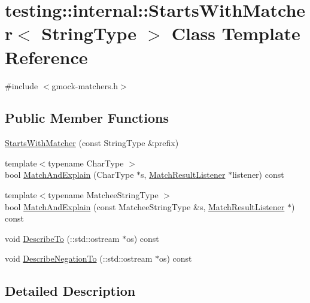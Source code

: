 \hypertarget{classtesting_1_1internal_1_1_starts_with_matcher}{}\section{testing\+:\+:internal\+:\+:Starts\+With\+Matcher$<$ String\+Type $>$ Class Template Reference}
\label{classtesting_1_1internal_1_1_starts_with_matcher}


{\ttfamily \#include $<$gmock-\/matchers.\+h$>$}

\subsection*{Public Member Functions}
\begin{DoxyCompactItemize}
\item 
\hyperlink{classtesting_1_1internal_1_1_starts_with_matcher_ab06a2a2a4c506771f20754bdbf8742bc}{Starts\+With\+Matcher} (const String\+Type \&prefix)
\item 
{\footnotesize template$<$typename Char\+Type $>$ }\\bool \hyperlink{classtesting_1_1internal_1_1_starts_with_matcher_ad9aa7f9761c63607a6a39c474575c2c9}{Match\+And\+Explain} (Char\+Type $\ast$s, \hyperlink{classtesting_1_1_match_result_listener}{Match\+Result\+Listener} $\ast$listener) const 
\item 
{\footnotesize template$<$typename Matchee\+String\+Type $>$ }\\bool \hyperlink{classtesting_1_1internal_1_1_starts_with_matcher_a5912b3df33ea79e6b602bcea0b60443d}{Match\+And\+Explain} (const Matchee\+String\+Type \&s, \hyperlink{classtesting_1_1_match_result_listener}{Match\+Result\+Listener} $\ast$) const 
\item 
void \hyperlink{classtesting_1_1internal_1_1_starts_with_matcher_a0d3d9be616c4b46dcb6beea8314b7633}{Describe\+To} (\+::std\+::ostream $\ast$os) const 
\item 
void \hyperlink{classtesting_1_1internal_1_1_starts_with_matcher_a1b59595290a390fd58f087da1d943a17}{Describe\+Negation\+To} (\+::std\+::ostream $\ast$os) const 
\end{DoxyCompactItemize}


\subsection{Detailed Description}

